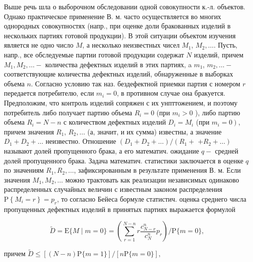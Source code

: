 \documentclass[10pt]{article}
\begin{document}
Выше речь шла о выборочном обследовании одной совокупности к.-л. объектов. Однако практическое применение В. м. часто осуществляется во многих однородных совокупностях (напр., при оценке доли бракованных изделий в нескольких партиях готовой продукции). В этой ситуации объектом изучения является не одно число $M$, а несколько неизвестных чисел $M_{1}$, $M_{2}, \ldots$. Пусть, напр., все обследуемые партии готовой продукции содержат $N$ изделий, причем $M_{1}, M_{2}, \ldots-$ количества дефектных изделий в этих партиях, a $m_{1}$, $m_{2}, \ldots-$ соответствующие количества дефектных изделий, обнаруженные в выборках объема $n$. Согласно условию так наз. бездефектной приемки партия с номером $r$ передается потребителю, если $m_{i}=0$, в противном случае она бракуется. Предположим, что контроль изделий сопряжен с их унпттожением, и поэтому потребитель либо получает партию объема $R_{i}=0$ (при $m_{i}>0$ ), либо партию объема $R_{i}=N-n$ с количеством дефектных изделий $D_{i}=M_{i}$ (при $\left.m_{i}=0\right)$, причем значения $R_{1}$, $R_{2}, \ldots$ (а, значит, и их сумма) известны, а значение $D_{1}+D_{2}+\ldots$ неизвестно. Отношение $\left(D_{1}+D_{2}+\ldots\right) /\left(R_{1}+\right.$ $\left.+R_{2}+\ldots\right)$ называют долей пропущенного брака, а его математич. ожидание $q-$ средней долей пропущенного брака. Задача математич. статистики заключается в оценке $q$ по значениям $R_{1}, R_{2}, \ldots$, зафиксированным в результате применения В. м. Если значения $M_{1}, M_{2}, \ldots$ можно трактовать как реализации независимых одинаково распределенных случайных величин с известным законом распределения $\mathrm{P}\left\{M_{i}=r\right\}=p_{r}$, то согласно Бейеса бормуле статистич. оценка среднего числа пропущенных дефектных изделий в принятых партиях выражается формулой



\[

\tilde{D}=\mathrm{E}\{M \mid m=0\}=\left(\sum_{r=1}^{N-n} r \frac{c_{N-r}^{n}}{c_{N}^{n}} p_{r}\right) / \mathrm{P}\{m=0\},

\]



причем $\tilde{D} \leqslant[(N-n) \mathrm{P}\{m=1\}] /[n \mathrm{P}\{m=0\}]$,
\end{document}
